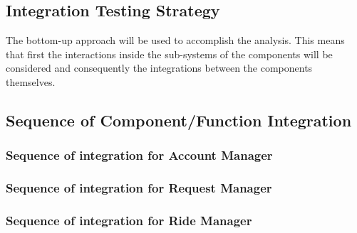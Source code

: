 \documentclass[a4paper,11pt]{report} %
\begin{document}
	\subsection{Integration Testing Strategy}
		The bottom-up approach will be used to accomplish the analysis. This means that first the interactions inside the sub-systems of the components will be considered and consequently the integrations between the components themselves.
	\subsection{Sequence of Component/Function Integration}
		\subsubsection{Sequence of integration for Account Manager}
			\begin{minipage}{\linewidth}
			\end{minipage}
			
		\subsubsection{Sequence of integration for Request Manager}
		\begin{minipage}{\linewidth}
		\end{minipage}
		
		\subsubsection{Sequence of integration for Ride Manager}
		\begin{minipage}{\linewidth}
		\end{minipage}
		
\end{document}
